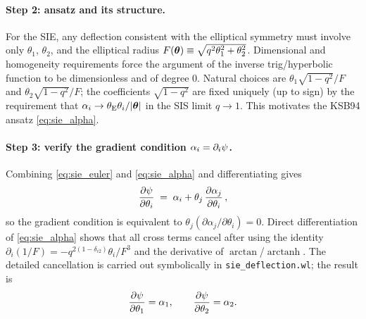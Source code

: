 \paragraph{Step 2: ansatz and its structure.}
For the SIE, any deflection consistent with the elliptical symmetry
must involve only $\theta_1$, $\theta_2$, and the elliptical radius
$F(\boldsymbol{\theta}) \equiv \sqrt{q^2\theta_1^2 + \theta_2^2}$.
Dimensional and homogeneity requirements force the argument of the
inverse trig/hyperbolic function to be dimensionless and of degree
$0$.  Natural choices are
$\theta_1\sqrt{1-q^2}/F$ and $\theta_2\sqrt{1-q^2}/F$; the
coefficients $\sqrt{1-q^2}$ are fixed uniquely (up to sign) by the
requirement that $\alpha_i \to \theta_{\mathrm{E}}\theta_i/|\boldsymbol{\theta}|$ in the
SIS limit $q\to 1$.  This motivates the KSB94 ansatz
\eqref{eq:sie_alpha}.

\paragraph{Step 3: verify the gradient condition $\alpha_i = \partial_i\psi$.}
Combining \eqref{eq:sie_euler} and \eqref{eq:sie_alpha} and
differentiating gives
\begin{equation*}
    \frac{\partial\psi}{\partial\theta_i}
    \;=\; \alpha_i
        + \theta_j\,\frac{\partial\alpha_j}{\partial\theta_i} \,,
\end{equation*}
so the gradient condition is equivalent to
$\theta_j(\partial\alpha_j/\partial\theta_i) = 0$.  Direct
differentiation of \eqref{eq:sie_alpha} shows that all cross terms
cancel after using the identity
$\partial_i(1/F) = -q^{2(1-\delta_{i2})}\theta_i/F^3$ and the
derivative of $\arctan$/$\operatorname{arctanh}$.  The detailed
cancellation is carried out symbolically in
\texttt{sie\_deflection.wl}; the result is
\begin{equation}
    \frac{\partial\psi}{\partial\theta_1} = \alpha_1,
    \qquad
    \frac{\partial\psi}{\partial\theta_2} = \alpha_2.
    \label{eq:sie_gradient_check}
\end{equation}


